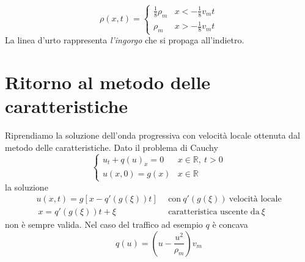 
\begin{equation*}
    \rho (x,t) =
    \begin{cases}
        \frac{1}{8} \rho _{m} & x< -\frac{1}{8} v_{m} t \\
        \rho _{m}             & x >-\frac{1}{8} v_{m} t
    \end{cases}
\end{equation*}
La linea d'urto rappresenta \textit{l'ingorgo} che si propaga all'indietro.

\section{Ritorno al metodo delle caratteristiche}

Riprendiamo la soluzione dell'onda progressiva con velocità locale ottenuta dal metodo delle caratteristiche. Dato il problema di Cauchy
\begin{equation*}
    \begin{cases}
        u_{t} +q(u)_{x} =0 & x\in \mathbb{R} ,\ t >0 \\
        u(x,0) =g(x)       & x\in \mathbb{R}
    \end{cases}
\end{equation*}
la soluzione
\begin{align*}
    u(x,t) =g[ x-q'(g(\xi)) t] & \ \ \text{con} \ q'(g(\xi)) \ \text{velocità locale} \\
    \ x=q'(g(\xi)) t+\xi       & \ \ \text{caratteristica uscente da} \ \xi
\end{align*}
non è sempre valida. Nel caso del traffico ad esempio $q$ è concava
\begin{equation*}
    q(u) =\left(u-\frac{u^{2}}{\rho _{m}}\right) v_{m}
\end{equation*}

